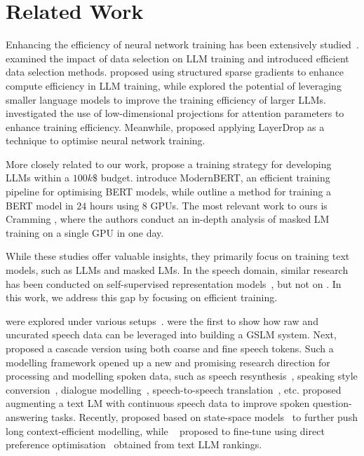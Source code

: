 \section{Related Work}
 Enhancing the efficiency of neural network training has been extensively studied~\citep{shen2023efficient}. \citet{hajimolahoseini2023swiftlearn, wang2024greats} examined the impact of data selection on \ac{LLM} training and introduced efficient data selection methods. \citet{muhamed2024grass} proposed using structured sparse gradients to enhance compute efficiency in \ac{LLM} training, while \citet{rawat2024little} explored the potential of leveraging smaller language models to improve the training efficiency of larger \ac{LLM}s. \citet{lv2024scalable} investigated the use of low-dimensional projections for attention parameters to enhance training efficiency. Meanwhile, \citet{neiterman2024layerdropback} proposed applying LayerDrop as a technique to optimise neural network training.

More closely related to our work, \citet{li2023flm} propose a training strategy for developing \ac{LLM}s within a $100k\$$ budget. \citet{warner2024modernbert} introduce ModernBERT, an efficient training pipeline for optimising BERT models, while \citet{izsak2021train} outline a method for training a BERT model in $24$ hours using $8$ GPUs. The most relevant work to ours is Cramming \cite{geiping2023cramming}, where the authors conduct an in-depth analysis of masked LM training on a single GPU in one day.

While these studies offer valuable insights, they primarily focus on training text models, such as \ac{LLM}s and masked LMs. In the speech domain, similar research has been conducted on self-supervised representation models~\citep{liu2024efficient}, but not on \slms. In this work, we address this gap by focusing on efficient \slm training.

 were explored under various setups~\citep{gslm, kharitonov2021text}.  
\citet{gslm} were the first to show how raw and uncurated speech data can be leveraged into building a \ac{GSLM} system. Next,~\citet{borsos2023audiolm} proposed a cascade version using both coarse and fine speech tokens. Such a modelling framework opened up a new and promising research direction for processing and modelling spoken data, such as speech resynthesis~\citep{polyak2021speech}, speaking style conversion~\citep{kreuk2021textless,maimon2023dissc}, dialogue modelling~\cite{nguyen2022generative}, speech-to-speech translation~\citep{popuri2022enhanced, peng2024mslm}, etc. 
\citet{nachmani2023spoken} proposed augmenting a text \ac{LM} with continuous speech data to improve spoken question-answering tasks. Recently, \citet{park2024long} proposed \slm based on state-space models~\citep{gu2021efficiently} to further push long context-efficient modelling, while ~\citet{lin2024alignslm} proposed to fine-tune \slms using direct preference optimisation~\citep{rafailov2024dpo} obtained from text LLM rankings. 

